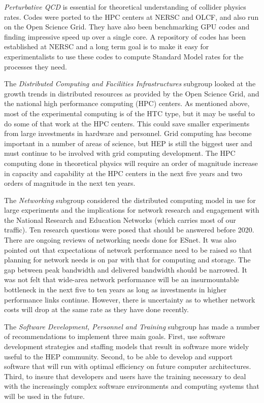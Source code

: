 {\it Perturbative QCD} is essential for theoretical understanding of collider physics rates. Codes were ported to the HPC centers at  NERSC and OLCF, and also run on the Open Science Grid. They have also been benchmarking GPU codes and finding impressive speed up over a single core.  A repository of codes has been established at NERSC and a long term goal is to make it easy for experimentalists to use these codes to compute Standard Model rates for the processes they need.

The {\it Distributed Computing and Facilities Infrastructures} subgroup looked at the growth trends in distributed resources as provided by the Open Science Grid, and the national high performance computing (HPC) centers.  As mentioned above, most of the experimental computing is of the HTC type, but it may be useful to do some of that work at the HPC centers.  This could save smaller experiments from large investments in hardware and personnel.  Grid computing has become important in a number of areas of science, but HEP is still the biggest user and must continue to be involved with grid computing development.  The HPC computing done in theoretical physics will require an order of magnitude increase in capacity and capability at the HPC centers in the next five years and two orders of magnitude in the next ten years.

The {\it Networking} subgroup considered the distributed computing model in use for large experiments and the implications for network research and engagement with the National Research and Education Networks (which carries most of our traffic). Ten research questions were posed that should be answered before 2020. There are ongoing reviews of networking needs done for ESnet. It was also pointed out that expectations of network performance need to be raised so that planning for network needs is on par with that for computing and storage.  The gap between peak bandwidth and delivered bandwidth should be narrowed.  It was not felt that wide-area network performance will be an insurmountable bottleneck in the next five to ten years as long as investments in higher performance links continue.  However, there is uncertainty as to whether network costs will drop at the same rate as they have done recently.

The {\it Software Development, Personnel and Training} subgroup has made a number of recommendations to implement three main goals.  First, use software development strategies and staffing models that result in software more widely useful to the HEP community.  Second, to be able to develop and support software that will run with optimal efficiency on future computer architectures. Third, to insure that developers and users have the training necessary to deal with the increasingly complex software environments and computing systems that will be used in the future.

